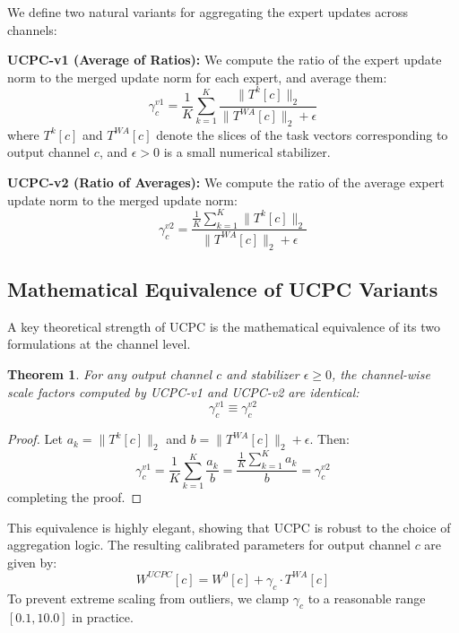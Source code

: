 \documentclass{article}
\theoremstyle{plain}
\newtheorem{theorem}{Theorem}[section]
\theoremstyle{definition}
\theoremstyle{remark}
\begin{document}
We define two natural variants for aggregating the expert updates across channels:

\textbf{UCPC-v1 (Average of Ratios):} We compute the ratio of the expert update norm to the merged update norm for each expert, and average them:
\begin{equation}
  \gamma_c^{v1} = \frac{1}{K} \sum_{k=1}^K \frac{\|T^k[c]\|_2}{\|T^{WA}[c]\|_2 + \epsilon}
\end{equation}
where $T^k[c]$ and $T^{WA}[c]$ denote the slices of the task vectors corresponding to output channel $c$, and $\epsilon > 0$ is a small numerical stabilizer.

\textbf{UCPC-v2 (Ratio of Averages):} We compute the ratio of the average expert update norm to the merged update norm:
\begin{equation}
  \gamma_c^{v2} = \frac{\frac{1}{K}\sum_{k=1}^K \|T^k[c]\|_2}{\|T^{WA}[c]\|_2 + \epsilon}
\end{equation}

\subsection{Mathematical Equivalence of UCPC Variants}
A key theoretical strength of UCPC is the mathematical equivalence of its two formulations at the channel level.
\begin{theorem}
  For any output channel $c$ and stabilizer $\epsilon \ge 0$, the channel-wise scale factors computed by UCPC-v1 and UCPC-v2 are identical:
  \begin{equation}
    \gamma_c^{v1} \equiv \gamma_c^{v2}
  \end{equation}
\end{theorem}
\begin{proof}
  Let $a_k = \|T^k[c]\|_2$ and $b = \|T^{WA}[c]\|_2 + \epsilon$.
  Then:
  \begin{equation}
    \gamma_c^{v1} = \frac{1}{K}\sum_{k=1}^K \frac{a_k}{b} = \frac{\frac{1}{K}\sum_{k=1}^K a_k}{b} = \gamma_c^{v2}
  \end{equation}
  completing the proof.
\end{proof}
This equivalence is highly elegant, showing that UCPC is robust to the choice of aggregation logic. The resulting calibrated parameters for output channel $c$ are given by:
\begin{equation}
  W^{UCPC}[c] = W^0[c] + \gamma_c \cdot T^{WA}[c]
\end{equation}
To prevent extreme scaling from outliers, we clamp $\gamma_c$ to a reasonable range $[0.1, 10.0]$ in practice.
\end{document}
